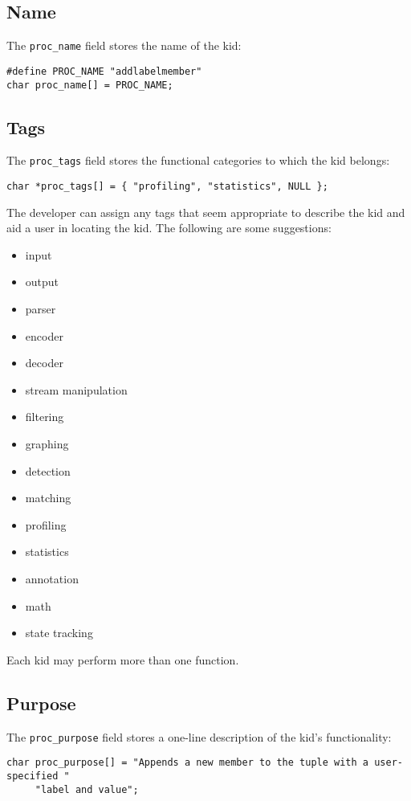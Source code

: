 \documentclass[11pt]{article}
\begin{document}
\subsection{Name}
The \texttt{proc\_name} field stores the name of the kid:
\begin{lstlisting}
#define PROC_NAME "addlabelmember"
char proc_name[] = PROC_NAME;
\end{lstlisting}

\subsection{Tags}
The \texttt{proc\_tags} field stores the functional categories to which the kid belongs:
\begin{lstlisting}
char *proc_tags[] = { "profiling", "statistics", NULL };
\end{lstlisting}
The developer can assign any tags that seem appropriate to describe the kid and aid a user in locating the kid. The
following are some suggestions:
\begin{itemize}
\item input
\item output
\item parser
\item encoder
\item decoder
\item stream manipulation
\item filtering
\item graphing
\item detection
\item matching
\item profiling
\item statistics
\item annotation
\item math
\item state tracking
\end{itemize}
Each kid may perform more than one function.

\subsection{Purpose}
The \texttt{proc\_purpose} field stores a one-line description of the kid's functionality:
\begin{lstlisting}
char proc_purpose[] = "Appends a new member to the tuple with a user-specified "
     "label and value";
\end{lstlisting}
\end{document}
